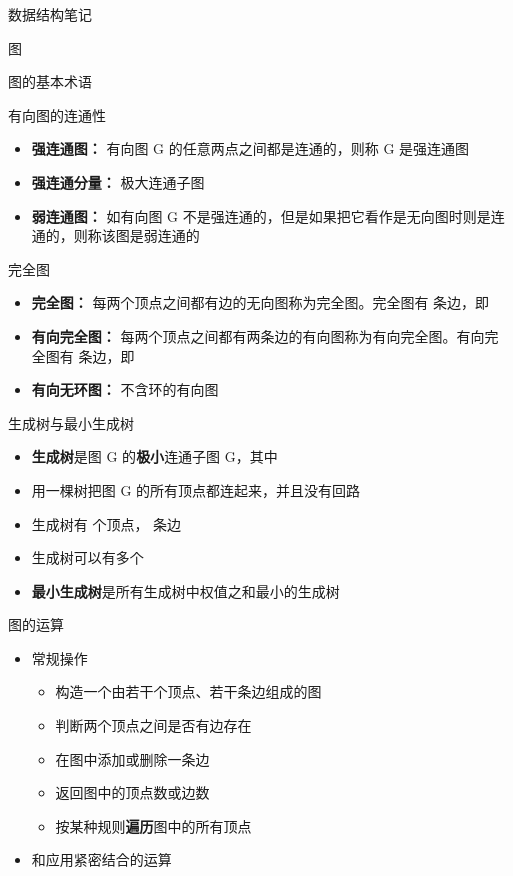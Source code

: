 \documentclass[
  ignorenonframetext,
]{beamer}
\providecommand{\tightlist}{%
  \setlength{\itemsep}{0pt}\setlength{\parskip}{0pt}}
\begin{document}
\begin{frame}[fragile]{数据结构笔记}
\begin{block}{图}
\begin{block}{图的基本术语}
\begin{block}{有向图的连通性}
\protect{}\label{ux6709ux5411ux56feux7684ux8fdeux901aux6027}
\begin{itemize}
\tightlist
\item
  \textbf{强连通图：} 有向图 G 的任意两点之间都是连通的，则称 G
  是强连通图
\item
  \textbf{强连通分量：} 极大连通子图
\item
  \textbf{弱连通图：} 如有向图 G
  不是强连通的，但是如果把它看作是无向图时则是连通的，则称该图是弱连通的
\end{itemize}
\end{block}

\begin{block}{完全图}
\protect{}\label{ux5b8cux5168ux56fe}
\begin{itemize}
\tightlist
\item
  \textbf{完全图：} 每两个顶点之间都有边的无向图称为完全图。完全图有 {}
  条边，即 {}
\item
  \textbf{有向完全图：}
  每两个顶点之间都有两条边的有向图称为有向完全图。有向完全图有 {}
  条边，即 {}
\item
  \textbf{有向无环图：} 不含环的有向图
\end{itemize}
\end{block}

\begin{block}{生成树与最小生成树}
\protect{}\label{ux751fux6210ux6811ux4e0eux6700ux5c0fux751fux6210ux6811}
\begin{itemize}
\tightlist
\item
  \textbf{生成树}是图 G 的\textbf{极小}连通子图 G\textquotesingle，其中
  {}
\item
  用一棵树把图 G 的所有顶点都连起来，并且没有回路
\item
  生成树有 {} 个顶点，{} 条边
\item
  生成树可以有多个
\item
  \textbf{最小生成树}是所有生成树中权值之和最小的生成树
\end{itemize}
\end{block}
\end{block}

\begin{block}{图的运算}
\protect{}\label{ux56feux7684ux8fd0ux7b97}
\begin{itemize}
\tightlist
\item
  常规操作

  \begin{itemize}
  \tightlist
  \item
    构造一个由若干个顶点、若干条边组成的图
  \item
    判断两个顶点之间是否有边存在
  \item
    在图中添加或删除一条边
  \item
    返回图中的顶点数或边数
  \item
    按某种规则\textbf{遍历}图中的所有顶点
  \end{itemize}
\item
  和应用紧密结合的运算


\end{itemize}
\end{block}
\end{block}
\end{frame}
\end{document}
